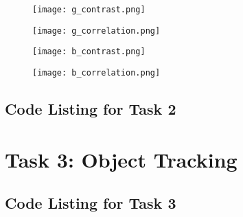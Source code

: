 \documentclass{report}
\begin{document}
\begin{appendices}
\begin{figure}
    \texttt{[image: g\_contrast.png]}
\end{figure}

\begin{figure}
    \texttt{[image: g\_correlation.png]}
\end{figure}

\begin{figure}
    \texttt{[image: b\_contrast.png]}
\end{figure}

\begin{figure}
    \texttt{[image: b\_correlation.png]}
\end{figure}

\pagebreak

\section{Code Listing for Task 2}




\chapter{Task 3: Object Tracking} \label{sec:app_task3}

\section{Code Listing for Task 3}



\end{appendices}
\end{document}

